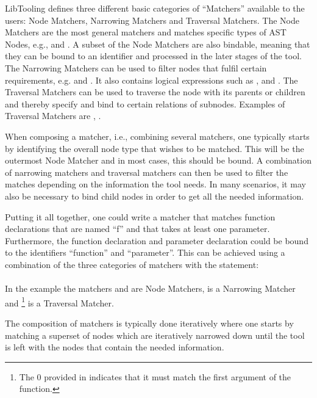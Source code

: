 LibTooling defines three different basic categories of ``Matchers'' available to the users: Node Matchers, Narrowing Matchers and Traversal Matchers.
The Node Matchers are the most general matchers and matches specific types of AST Nodes, e.g.,  and . A subset of the Node Matchers are also bindable, meaning that they can be bound to an identifier and processed in the later stages of the tool.
The Narrowing Matchers can be used to filter nodes that fulfil certain requirements, e.g.  and . It also contains logical expressions such as , and .
The Traversal Matchers can be used to traverse the node with its parents or children and thereby specify and bind to certain relations of subnodes. Examples of Traversal Matchers are ,  \cite{clangASTMatcherReference}.

When composing a matcher, i.e., combining several matchers, one typically starts by identifying the overall node type that wishes to be matched. This will be the outermost Node Matcher and in most cases, this should be bound.
A combination of narrowing matchers and traversal matchers can then be used to filter the matches depending on the information the tool needs.
In many scenarios, it may also be necessary to bind child nodes in order to get all the needed information.

Putting it all together, one could write a matcher that matches function declarations that are named ``f'' and that takes at least one parameter. Furthermore, the function declaration and parameter declaration could be bound to the identifiers ``function'' and ``parameter''.
This can be achieved using a combination of the three categories of matchers with the statement:\\ \\
In the example the matchers  and  are Node Matchers,  is a Narrowing Matcher and \footnote{The 0 provided in  indicates that it must match the first argument of the function.} is a Traversal Matcher.

The composition of matchers is typically done iteratively where one starts by matching a superset of nodes which are iteratively narrowed down until the tool is left with the nodes that contain the needed information. 

